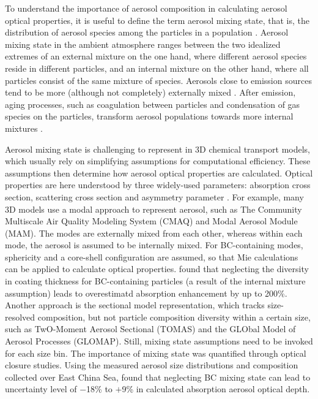 \documentclass[edeposit,fullpage]{uiucthesis2009}
\begin{document}
To understand the importance of aerosol composition in calculating
aerosol optical properties, it is useful to define the term aerosol
mixing state, that is, the distribution of aerosol species among the
particles in a population \citep{Riemer2009,Riemer2013a}. Aerosol
mixing state in the ambient atmosphere ranges between the two
idealized extremes of an external mixture on the one hand, where
different aerosol species reside in different particles, and an
internal mixture on the other hand, where all particles consist of the
same mixture of species. Aerosols close to emission sources tend to be
more (although not completely) externally mixed \citep{Bondy2018,
  Rissler2014}. After emission, aging processes, such as coagulation
between particles and condensation of gas species on the particles,
transform aerosol populations towards more internal mixtures
\citep{Healy2014, Liu2013, Zaveri2010a}.

Aerosol mixing state is challenging to represent in 3D chemical
transport models, which usually rely on simplifying assumptions for
computational efficiency. These assumptions then determine how aerosol
optical properties are calculated. Optical properties are here
understood by three widely-used parameters: absorption cross section,
scattering cross section and asymmetry parameter \citep{Majdi2020}.
For example, many 3D models use a modal approach to represent aerosol,
such as The Community Multiscale Air Quality Modeling System (CMAQ)\citep{Binkowski2007,
  Appel2017} and Modal Aerosol Module (MAM)\citep{Liu2012}. The modes are externally mixed from each other,
whereas within each mode, the aerosol is assumed to be internally
mixed. For BC-containing modes, sphericity and a core-shell
configuration are assumed, so that Mie calculations can be applied to
calculate optical properties. \citet{Fierce2016} found that neglecting
the diversity in coating thickness for BC-containing particles (a
result of the internal mixture assumption) leads to overestimatd
absorption enhancement by up to 200\%. Another approach is the
sectional model representation, which tracks size-resolved
composition, but not particle composition diversity within a certain
size, such as TwO-Moment Aerosol Sectional (TOMAS) and the GLObal
Model of Aerosol Processes (GLOMAP)\citep{kodros2018size,
  spracklen2005global}.  Still, mixing state assumptions need to be
invoked for each size bin. The importance of mixing state was
quantified through optical closure studies.  Using the measured
aerosol size distributions and composition collected over East China
Sea, \citet{koike2014case} found that neglecting BC mixing state can
lead to uncertainty level of $-$18\% to $+$9\% in calculated
absorption aerosol optical depth.
\end{document}
